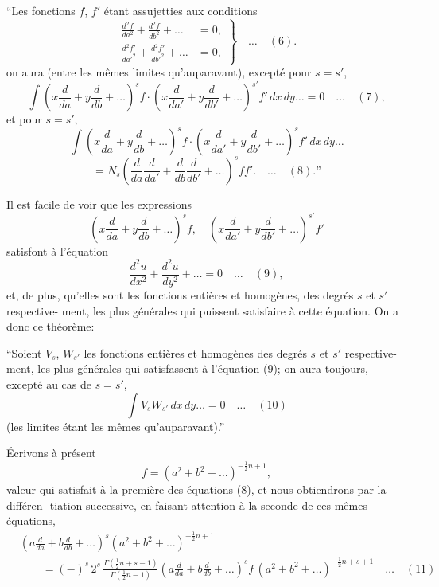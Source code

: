 \documentclass[11pt]{article}
\begin{document}
``Les fonctions $f$, $f'$ \'etant assujetties aux conditions
\[
\left.\begin{aligned}
\frac{d^{2}f}{da^{2}} + \frac{d^{2}f}{db^{2}} + \ldots &= 0,\\
\frac{d^{2}f'}{da'^{2}} + \frac{d^{2}f'}{db'^{2}} + \ldots &= 0,
\end{aligned}\right\}\quad\ldots\quad (6).
\]
on aura (entre les m\^emes limites qu'auparavant), except\'e pour $s = s'$,
\[
\int\!\left(x\frac{d}{da} + y\frac{d}{db} + \ldots\right)^{\!s}\!\!f\cdot\left(x\frac{d}{da'} + y\frac{d}{db'} + \ldots\right)^{\!s'}\!\!f'\,dx\,dy\ldots = 0\quad\ldots\quad (7),
\]
et pour $s = s'$,
\[
\int\!\left(x\frac{d}{da} + y\frac{d}{db} + \ldots\right)^{\!s}\!\!f\cdot\left(x\frac{d}{da'} + y\frac{d}{db'} + \ldots\right)^{\!s}\!\!f'\,dx\,dy\ldots
\]
\[
= N_{s}\!\left(\frac{d}{da}\frac{d}{da'} + \frac{d}{db}\frac{d}{db'} + \ldots\right)^{\!s}\!\!ff'.\quad\ldots\quad (8).\text{''}
\]

\medskip
Il est facile de voir que les expressions
\[
\left(x\frac{d}{da} + y\frac{d}{db} + \ldots\right)^{\!s}\!\!f,\quad
\left(x\frac{d}{da'} + y\frac{d}{db'} + \ldots\right)^{\!s'}\!\!f'
\]
satisfont \`a l'\'equation
\[
\frac{d^{2}u}{dx^{2}} + \frac{d^{2}u}{dy^{2}} + \ldots = 0\quad\ldots\quad (9),
\]
et, de plus, qu'elles sont les fonctions enti\`eres et homog\`enes, des degr\'es $s$ et $s'$ respective-
ment, les plus g\'en\'erales qui puissent satisfaire \`a cette \'equation. On a donc ce th\'eor\`eme:

\medskip
``Soient $V_{s}$, $W_{s'}$ les fonctions enti\`eres et homog\`enes des degr\'es $s$ et $s'$ respective-
ment, les plus g\'en\'erales qui satisfassent \`a l'\'equation (9); on aura toujours, except\'e au
cas de $s = s'$,
\[
\int V_{s}W_{s'}\,dx\,dy\ldots = 0\quad\ldots\quad (10)
\]
(les limites \'etant les m\^emes qu'auparavant).''

\medskip
\'Ecrivons \`a pr\'esent
\[
f = (a^{2} + b^{2} + \ldots)^{-\tfrac{1}{2}n + 1},
\]
valeur qui satisfait \`a la premi\`ere des \'equations (8), et nous obtiendrons par la diff\'eren-
tiation successive, en faisant attention \`a la seconde de ces m\^emes \'equations,
\begin{align*}
&\left(a\frac{d}{da} + b\frac{d}{db} + \ldots\right)^{\!s}\!\!(a^{2} + b^{2} + \ldots)^{-\tfrac{1}{2}n + 1}\\
&\qquad = (-)^{s}\,2^{s}\,\frac{\Gamma(\tfrac{1}{2}n + s - 1)}{\Gamma(\tfrac{1}{2}n - 1)}\!\left(a\frac{d}{da} + b\frac{d}{db} + \ldots\right)^{\!s}\!\!f\,(a^{2} + b^{2} + \ldots)^{-\tfrac{1}{2}n + s + 1}\quad\ldots\quad (11)
\end{align*}
\end{document}
